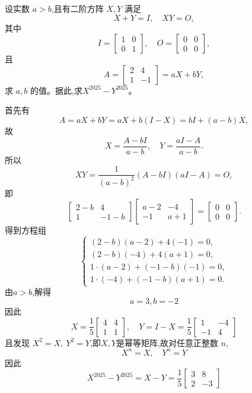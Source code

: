 \begin{questions}
    \question 设实数 $a>b$,且有二阶方阵 $X,Y$ 满足
    \[
    X + Y = I, \quad XY = O,
    \]
    其中
    \[
    I = \begin{bmatrix}1 & 0 \\ 0 & 1 \end{bmatrix}, \quad O = \begin{bmatrix}0 & 0 \\ 0 & 0 \end{bmatrix},
    \]
    且
    \[
    A = \begin{bmatrix} 2 & 4 \\ 1 & -1 \end{bmatrix} = aX + bY,
    \]
    求 $a,b$ 的值。据此,求$X^{2025}-Y^{2025}$。
    \begin{solution}
        首先有
        \[
        A = aX + bY = aX + b(I - X) = bI + (a - b)X,
        \]
        故
        \[
        X = \frac{A - bI}{a - b}, \quad Y = \frac{aI - A}{a - b}.
        \]
        所以
        \[
        XY = \frac{1}{(a - b)^2} (A - bI)(aI - A) = O,
        \]
        即
        \[
        \begin{bmatrix} 2 - b & 4 \\ 1 & -1 - b \end{bmatrix}
        \begin{bmatrix} a - 2 & -4 \\ -1 & a + 1 \end{bmatrix}
        = \begin{bmatrix} 0 & 0 \\ 0 & 0 \end{bmatrix}.
        \]
        得到方程组
        \[
        \begin{cases}
        (2 - b)(a - 2) + 4(-1) = 0, \\
        (2 - b)(-4) + 4(a + 1) = 0, \\
        1 \cdot (a - 2) + (-1 - b)(-1) = 0, \\
        1 \cdot (-4) + (-1 - b)(a + 1) = 0.
        \end{cases}
        \]
        由$a>b$,解得
        \[
        a = 3 ,b = -2 
        \]
        因此
        \[
        X=\frac{1}{5}\begin{bmatrix}4&4\\1&1\end{bmatrix},\quad
        Y=I-X=\frac{1}{5}\begin{bmatrix}1&-4\\-1&4\end{bmatrix}
        \]
        且发现 $X^2=X,\ Y^2=Y$,即$X,Y$是幂等矩阵,故对任意正整数 $n$,
        \[
        X^n=X,\quad Y^n=Y
        \]
        因此
        \[
        X^{2025}-Y^{2025}=X-Y=\frac{1}{5}\begin{bmatrix}3&8\\2&-3\end{bmatrix}
        \]
    \end{solution}


\end{questions}
